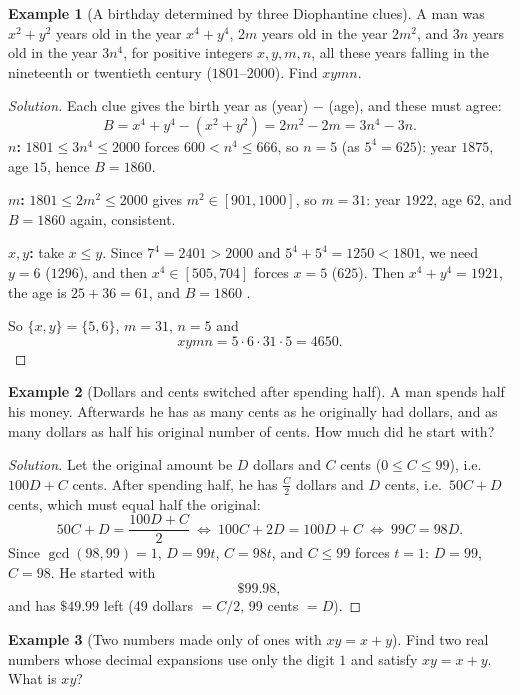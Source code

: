 \documentclass[11pt]{article}
\theoremstyle{definition}
\newtheorem{example}{Example}[section]
\begin{document}
\begin{example}[A birthday determined by three Diophantine clues]
A man was $x^2+y^2$ years old in the year $x^4+y^4$, $2m$ years old in the year $2m^2$, and $3n$ years old in the year $3n^4$, for positive integers $x,y,m,n$, all these years falling in the nineteenth or twentieth century ($1801$--$2000$). Find $xymn$.
\end{example}

\begin{proof}[Solution]
Each clue gives the birth year as (year) $-$ (age), and these must agree:
\[
B=x^4+y^4-(x^2+y^2)=2m^2-2m=3n^4-3n .
\]
\textbf{$n$:} $1801\le3n^4\le2000$ forces $600<n^4\le666$, so $n=5$ (as $5^4=625$): year $1875$, age $15$, hence $B=1860$.

\textbf{$m$:} $1801\le2m^2\le2000$ gives $m^2\in[901,1000]$, so $m=31$: year $1922$, age $62$, and $B=1860$ again, consistent.

\textbf{$x,y$:} take $x\le y$. Since $7^4=2401>2000$ and $5^4+5^4=1250<1801$, we need $y=6$ ($1296$), and then $x^4\in[505,704]$ forces $x=5$ ($625$). Then $x^4+y^4=1921$, the age is $25+36=61$, and $B=1860$ \checkmark.

So $\{x,y\}=\{5,6\}$, $m=31$, $n=5$ and
\[
xymn=5\cdot6\cdot31\cdot5=\boxed{4650}.
\]
\end{proof}

\begin{example}[Dollars and cents switched after spending half]
A man spends half his money. Afterwards he has as many cents as he originally had dollars, and as many dollars as half his original number of cents. How much did he start with?
\end{example}

\begin{proof}[Solution]
Let the original amount be $D$ dollars and $C$ cents ($0\le C\le99$), i.e.\ $100D+C$ cents. After spending half, he has $\tfrac C2$ dollars and $D$ cents, i.e.\ $50C+D$ cents, which must equal half the original:
\[
50C+D=\frac{100D+C}2\ \Longleftrightarrow\ 100C+2D=100D+C\ \Longleftrightarrow\ 99C=98D .
\]
Since $\gcd(98,99)=1$, $D=99t$, $C=98t$, and $C\le99$ forces $t=1$: $D=99$, $C=98$. He started with
\[
\boxed{\$99.98},
\]
and has $\$49.99$ left (49 dollars $=C/2$, 99 cents $=D$).
\end{proof}

\begin{example}[Two numbers made only of ones with $xy=x+y$]
Find two real numbers whose decimal expansions use only the digit $1$ and satisfy $xy=x+y$. What is $xy$?
\end{example}
\end{document}
